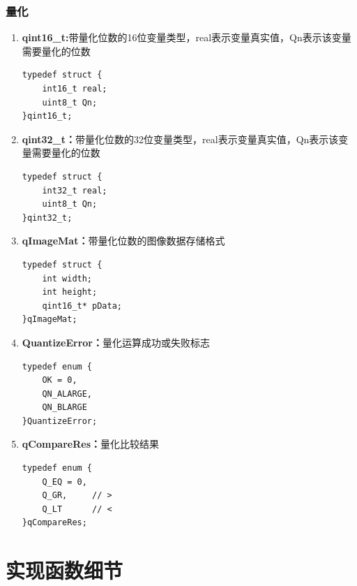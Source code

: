 \documentclass[12pt, a4paper, oneside]{ctexbook}
\begin{document}
		\subsubsection{量化}
		\begin{enumerate}
			\item \textbf{qint16\_t:}带量化位数的16位变量类型，real表示变量真实值，Qn表示该变量需要量化的位数
			\begin{lstlisting}
typedef struct {
	int16_t real;		
	uint8_t Qn;			
}qint16_t;					
			\end{lstlisting}
			\item \textbf{qint32\_t：}带量化位数的32位变量类型，real表示变量真实值，Qn表示该变量需要量化的位数
			\begin{lstlisting}
typedef struct {
	int32_t real;	
	uint8_t Qn;		
}qint32_t;				
			\end{lstlisting}
			\item \textbf{qImageMat：}带量化位数的图像数据存储格式
			\begin{lstlisting}
typedef struct {
	int width;
	int height;
	qint16_t* pData;
}qImageMat;			
			\end{lstlisting}
			\item \textbf{QuantizeError：}量化运算成功或失败标志
			\begin{lstlisting}
typedef enum {
	OK = 0,
	QN_ALARGE,
	QN_BLARGE
}QuantizeError;		
			\end{lstlisting}
			\item \textbf{qCompareRes：}量化比较结果
			\begin{lstlisting}
typedef enum {
	Q_EQ = 0,	
	Q_GR,     // >
	Q_LT      // <
}qCompareRes;		
			\end{lstlisting}
			
		\end{enumerate}
		
		
		
		
		
		
		\section{实现函数细节}	
\end{document}
